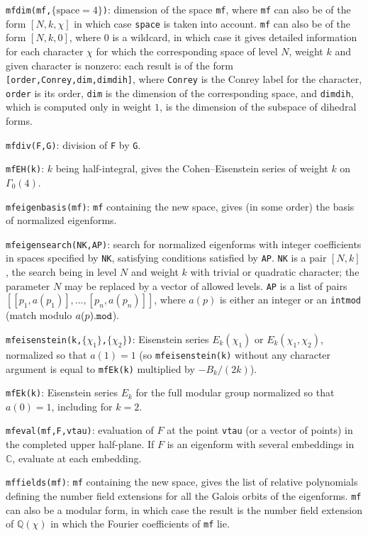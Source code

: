 \documentclass[11pt]{article}
\newcommand{\Q}{{\mathbb Q}}
\newcommand{\C}{{\mathbb C}}
\newcommand{\G}{\Gamma}
\def\kbd#1{{\tt #1}}
\begin{document}
\f\kbd{mfdim(mf,$\{\text{space}=4\}$)}: dimension of the space \kbd{mf},
where \kbd{mf} can also be of the form $[N,k,\chi]$ in which case \kbd{space}
is taken into account. \kbd{mf} can also be of the form $[N,k,0]$, where $0$
is a wildcard, in which case it gives detailed information for each character
$\chi$ for which the corresponding space of level $N$, weight $k$ and given
character is nonzero: each result is of the form
\kbd{[order,Conrey,dim,dimdih]}, where \kbd{Conrey} is the Conrey label for
the character, \kbd{order} is its order, \kbd{dim} is the dimension of the
corresponding space, and \kbd{dimdih}, which is computed only in weight $1$,
is the dimension of the subspace of dihedral forms.

\f\kbd{mfdiv(F,G)}: division of \kbd{F} by \kbd{G}.

\f\kbd{mfEH(k)}: $k$ being half-integral, gives the Cohen--Eisenstein series
of weight $k$ on $\G_0(4)$.

\f\kbd{mfeigenbasis(mf)}: \kbd{mf} containing the new space, gives
(in some order) the basis of normalized eigenforms.

\f\kbd{mfeigensearch(NK,AP)}: search for normalized eigenforms with
integer coefficients in spaces specified by \kbd{NK}, satisfying conditions
satisfied by \kbd{AP}. \kbd{NK} is a pair $[N,k]$, the search being in
level $N$ and weight $k$ with trivial or quadratic character; the parameter
$N$ may be replaced by a vector of allowed levels. \kbd{AP} is a list of pairs
$[[p_1,a(p_1)],...,[p_n,a(p_n)]]$, where $a(p)$ is either an integer or an
\kbd{intmod} (match modulo $a(p)\kbd{.mod}$).

\f\kbd{mfeisenstein(k,$\{\chi_1\}$,$\{\chi_2\}$)}: Eisenstein series
$E_k(\chi_1)$ or
$E_k(\chi_1,\chi_2)$, normalized so that $a(1)=1$ (so \kbd{mfeisenstein(k)}
without any character argument is equal to \kbd{mfEk(k)} multiplied by
$-B_k/(2k)$).

\f\kbd{mfEk(k)}: Eisenstein series $E_k$ for the full modular group normalized
so that $a(0)=1$, including for $k=2$.

\f\kbd{mfeval(mf,F,vtau)}: evaluation of $F$ at the point \kbd{vtau} (or a
vector of points) in the completed upper half-plane. If $F$ is an eigenform
with several embeddings in $\C$, evaluate at each embedding.

\f\kbd{mffields(mf)}: \kbd{mf} containing the new space, gives the list of
relative polynomials defining the number field extensions for all the Galois
orbits of the eigenforms. \kbd{mf} can also be a modular form, in which case
the result is the number field extension of $\Q(\chi)$ in which the Fourier
coefficients of \kbd{mf} lie.
\end{document}
